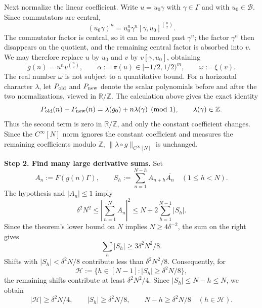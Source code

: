 \documentclass[twoside]{aomart}
\makeatletter
\theoremstyle{paperplain}
\theoremstyle{paperdefinition}
\renewenvironment{proof}[1][\proofname]{\par\pushQED{\qed}%
  \normalfont\topsep6\p@\@plus3\p@\relax\trivlist
  \item[\hskip\labelsep\itshape #1\@addpunct{.}]\ignorespaces
}{\popQED\endtrivlist\@endpefalse}
\numberwithin{equation}{section}
\makeatother
\begin{document}
\begin{proof}
Next normalize the linear coefficient. Write $u=u_0\gamma$ with
$\gamma\in\Gamma$ and with $u_0\in\mathcal B$.
Since commutators are central,
\begin{equation}
 (u_0\gamma)^n
 =u_0^n\gamma^n[\gamma,u_0]^{\binom n2}.
\label{inv:eq:normalize-linear}
\end{equation}
The commutator factor is central, so it can be moved past $\gamma^n$;
the factor $\gamma^n$ then disappears on the quotient, and the remaining
central factor is absorbed into $v$. We may therefore replace $u$ by
$u_0$ and $v$ by $v[\gamma,u_0]$, obtaining
\begin{equation*}
 g(n)=u^nv^{\binom n2},\qquad
 \alpha:=\pi(u)\in[-1/2,1/2)^m,\qquad
 \omega:=\xi(v).
\end{equation*}
The real number $\omega$ is not subject to a quantitative bound.
For a horizontal character $\lambda$, let $P_{\rm old}$ and
$P_{\rm new}$ denote the scalar polynomials before and after the two
normalizations, viewed in $\mathbb R/\mathbb Z$. The calculation above
gives the exact identity
\begin{equation*}
 P_{\rm old}(n)-P_{\rm new}(n)
 =\lambda(g_0)+n\lambda(\gamma)\pmod 1,
 \qquad \lambda(\gamma)\in\mathbb Z.
\end{equation*}
Thus the second term is zero in $\mathbb R/\mathbb Z$, and only the
constant coefficient changes. Since the $C^\infty[N]$ norm ignores the
constant coefficient and measures the remaining coefficients modulo
$\mathbb Z$, $\|\lambda\circ g\|_{C^\infty[N]}$ is unchanged.

\par
\medskip
\noindent\textbf{Step 2. Find many large derivative sums.}
Set
\[
 A_n:=F(g(n)\Gamma),\qquad
 S_h:=\sum_{n=1}^{N-h}A_{n+h}\overline{A_n}
 \quad(1\le h<N).
\]
The hypothesis and $|A_n|\le1$ imply
\begin{equation*}
 \delta^2N^2
 \le\left|\sum_{n=1}^NA_n\right|^2
 \le N+2\sum_{h=1}^{N-1}|S_h|.
\end{equation*}
Since the theorem's lower bound on $N$ implies $N\ge4\delta^{-2}$,
the sum on the right gives
$$\sum_h|S_h|\ge3\delta^2N^2/8.$$ Shifts with
$|S_h|<\delta^2N/8$ contribute less than $\delta^2N^2/8$.
Consequently, for
\[
 \mathcal H:=\{h\in[N-1]: |S_h|\ge\delta^2N/8\},
\]
the remaining shifts contribute at least $\delta^2N^2/4$. Since
$|S_h|\le N-h\le N$, we obtain
\begin{equation*}
 |\mathcal H|\ge\delta^2N/4,\qquad
 |S_h|\ge\delta^2N/8,\qquad
 N-h\ge\delta^2N/8\quad(h\in\mathcal H).
\end{equation*}


\end{proof}
\end{document}
